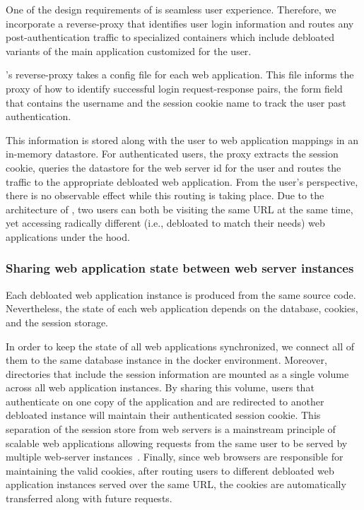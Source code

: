 One of the design requirements of \sys{} is seamless user experience. 
Therefore, we incorporate a reverse-proxy that identifies user login information and routes any post-authentication traffic to specialized containers which include debloated variants of the main application customized for the user. 

\sys{}'s reverse-proxy takes a config file for each web application. 
This file informs the proxy of how to identify successful login request-response pairs, the form field that contains the username and the session cookie name to track the user past authentication. 

This information is stored along with the user to web application mappings in an in-memory datastore. 
For authenticated users, the proxy extracts the session cookie, queries the datastore for the web server id for the user and routes the traffic to the appropriate debloated web application. 
From the user's perspective, there is no observable effect while this routing is taking place. Due to the architecture of \sys{}, two users can both be visiting the same URL at the same time, yet accessing radically different (i.e., debloated to match their needs) web applications under the hood. 

\subsubsection{Sharing web application state between web server instances}

Each debloated web application instance is produced from the same source code. 
Nevertheless, the state of each web application depends on the database, cookies, and the session storage. 

In order to keep the state of all web applications synchronized, we connect all of them to the same database instance in the docker environment. 
Moreover, directories that include the session information are mounted as a single volume across all web application instances. 
By sharing this volume, users that authenticate on one copy of the application and are redirected to another debloated instance will maintain their authenticated session cookie. This separation of the session store from web servers is a mainstream principle of scalable web applications allowing requests from the same user to be served by multiple web-server instances~\cite{scalability-book}.
Finally, since web browsers are responsible for maintaining the valid cookies, after routing users to different debloated web application instances served over the same URL, the cookies are automatically transferred along with future requests. 
